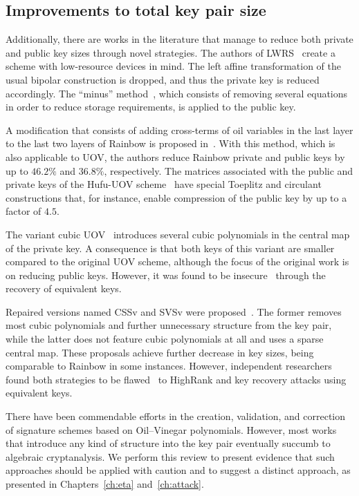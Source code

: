 \documentclass[12pt, a4paper, oneside]{memoir}
\theoremstyle{definition}
\begin{document}
\subsection{Improvements to total key pair size}\label{subsec:both}

Additionally, there are works in the literature that manage to reduce both private and public key sizes through novel strategies. The authors of LWRS~\cite{Zhang:201208} create a scheme with low-resource devices in mind. The left affine transformation of the usual bipolar construction is dropped, and thus the private key is reduced accordingly. The ``minus'' method~\cite[Sec.~3.2.1]{Wolf:200511}, which consists of removing several equations in order to reduce storage requirements, is applied to the public key.

A modification that consists of adding cross-terms of oil variables in the last layer to the last two layers of Rainbow is proposed in~\cite{Tan:201603}. With this method, which is also applicable to UOV, the authors reduce Rainbow private and public keys by up to $46.2\%$ and $36.8\%$, respectively. The matrices associated with the public and private keys of the Hufu-UOV scheme~\cite{Tao:201905} have special Toeplitz and circulant constructions that, for instance, enable compression of the public key by up to a factor of $4.5$.

The variant cubic UOV~\cite{Nie:201511} introduces several cubic polynomials in the central map of the private key. A consequence is that both keys of this variant are smaller compared to the original UOV scheme, although the focus of the original work is on reducing public keys. However, it was found to be insecure~\cite{Hashimoto:201712} through the recovery of equivalent keys.

Repaired versions named CSSv and SVSv were proposed~\cite{Duong:201611}. The former removes most cubic polynomials and further unnecessary structure from the key pair, while the latter does not feature cubic polynomials at all and uses a sparse central map. These proposals achieve further decrease in key sizes, being comparable to Rainbow in some instances. However, independent researchers found both strategies to be flawed~\cite{Shim:201711,Hashimoto:201712} to HighRank and key recovery attacks using equivalent keys.

There have been commendable efforts in the creation, validation, and correction of signature schemes based on Oil--Vinegar polynomials. However, most works that introduce any kind of structure into the key pair eventually succumb to algebraic cryptanalysis. We perform this review to present evidence that such approaches should be applied with caution and to suggest a distinct approach, as presented in Chapters~\ref{ch:eta} and~\ref{ch:attack}.
\end{document}
